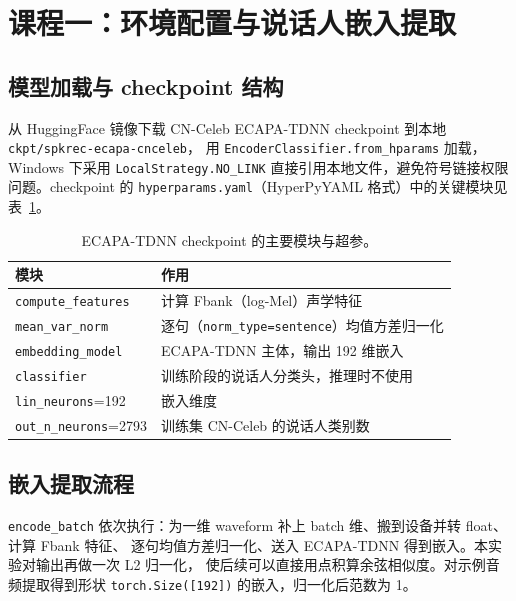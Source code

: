 \documentclass[a4paper]{article}
\begin{document}
\section{课程一：环境配置与说话人嵌入提取}
\subsection{模型加载与 checkpoint 结构}
从 HuggingFace 镜像下载 CN-Celeb ECAPA-TDNN checkpoint 到本地 \texttt{ckpt/spkrec-ecapa-cnceleb}，
用 \texttt{EncoderClassifier.from\_hparams} 加载，Windows 下采用 \texttt{LocalStrategy.NO\_LINK}
直接引用本地文件，避免符号链接权限问题。checkpoint 的 \texttt{hyperparams.yaml}（HyperPyYAML 格式）中的关键模块见表~\ref{tab:modules}。

\begin{table}[H]
  \centering
  \begin{tabularx}{\textwidth}{l X}
  \toprule
  模块 & 作用 \\
  \midrule
  \texttt{compute\_features} & 计算 Fbank（log-Mel）声学特征 \\
  \texttt{mean\_var\_norm} & 逐句（\texttt{norm\_type=sentence}）均值方差归一化 \\
  \texttt{embedding\_model} & ECAPA-TDNN 主体，输出 192 维嵌入 \\
  \texttt{classifier} & 训练阶段的说话人分类头，推理时不使用 \\
  \midrule
  \texttt{lin\_neurons}=192 & 嵌入维度 \\
  \texttt{out\_n\_neurons}=2793 & 训练集 CN-Celeb 的说话人类别数 \\
  \bottomrule
  \end{tabularx}
  \caption{ECAPA-TDNN checkpoint 的主要模块与超参。}
  \label{tab:modules}
\end{table}

\subsection{嵌入提取流程}
\texttt{encode\_batch} 依次执行：为一维 waveform 补上 batch 维、搬到设备并转 float、计算 Fbank 特征、
逐句均值方差归一化、送入 ECAPA-TDNN 得到嵌入。本实验对输出再做一次 L2 归一化，
使后续可以直接用点积算余弦相似度。对示例音频提取得到形状 \texttt{torch.Size([192])} 的嵌入，归一化后范数为 1。
\end{document}
